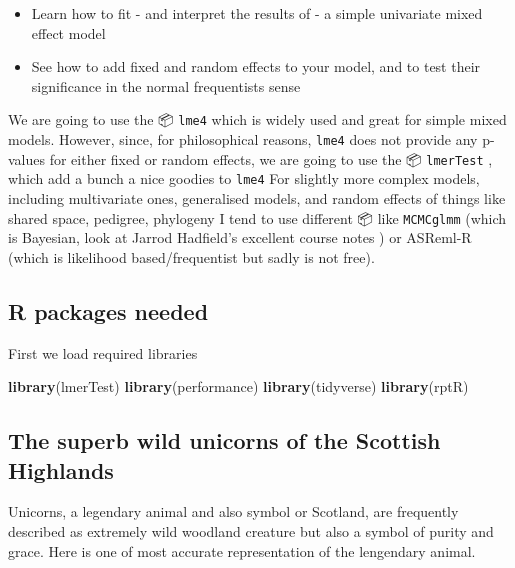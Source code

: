 \documentclass[
  12pt,
]{book}
\newenvironment{Shaded}{\begin{snugshade}}{\end{snugshade}}
\newcommand{\KeywordTok}[1]{\textcolor[rgb]{0.13,0.29,0.53}{\textbf{#1}}}
\newcommand{\NormalTok}[1]{#1}
\providecommand{\tightlist}{%
  \setlength{\itemsep}{0pt}\setlength{\parskip}{0pt}}
\begin{document}
\begin{itemize}
\tightlist
\item
  Learn how to fit - and interpret the results of - a simple univariate mixed effect model
\item
  See how to add fixed and random effects to your model, and to test their significance in the normal frequentists sense
\end{itemize}

We are going to use the 📦 \texttt{lme4} \citep{R-lme4} which is widely used and great for simple mixed models. However, since, for philosophical reasons, \texttt{lme4} does not provide any p-values for either fixed or random effects, we are going to use the 📦 \texttt{lmerTest} \citep{R-lmerTest}, which add a bunch a nice goodies to \texttt{lme4} For slightly more complex models, including multivariate ones, generalised models, and random effects of things like shared space, pedigree, phylogeny I tend to use different 📦 like \texttt{MCMCglmm} \citep{MCMCglmm2010} (which is Bayesian, look at Jarrod Hadfield's excellent course notes \citep{R-MCMCglmm}) or ASReml-R \citep{R-asreml} (which is likelihood based/frequentist but sadly is not free).

\hypertarget{r-packages-needed}{%
\subsection{R packages needed}\label{r-packages-needed}}

First we load required libraries

\begin{Shaded}
\begin{Highlighting}[]
\KeywordTok{library}\NormalTok{(lmerTest)}
\KeywordTok{library}\NormalTok{(performance)}
\KeywordTok{library}\NormalTok{(tidyverse)}
\KeywordTok{library}\NormalTok{(rptR)}
\end{Highlighting}
\end{Shaded}

\hypertarget{the-superb-wild-unicorns-of-the-scottish-highlands}{%
\subsection{The superb wild unicorns of the Scottish Highlands}\label{the-superb-wild-unicorns-of-the-scottish-highlands}}

Unicorns, a legendary animal and also symbol or Scotland, are frequently described as extremely wild woodland creature but also a symbol of purity and grace. Here is one of most accurate representation of the lengendary animal.
\end{document}

